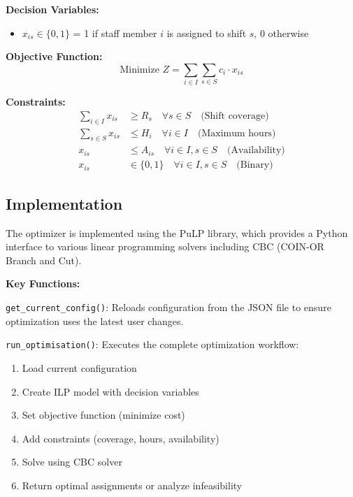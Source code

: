 \documentclass[12pt,a4paper]{article}
\begin{document}
\vspace{0.3em}
\noindent\textbf{Decision Variables:}
\begin{itemize}[topsep=4pt]
    \item $x_{is} \in \{0,1\}$ = 1 if staff member $i$ is assigned to shift $s$, 0 otherwise
\end{itemize}

\textbf{Objective Function:}
\begin{equation}
\text{Minimize } Z = \sum_{i \in I} \sum_{s \in S} c_i \cdot x_{is}
\end{equation}

\textbf{Constraints:}
\begin{align}
\sum_{i \in I} x_{is} &\geq R_s \quad \forall s \in S \quad \text{(Shift coverage)} \\
\sum_{s \in S} x_{is} &\leq H_i \quad \forall i \in I \quad \text{(Maximum hours)} \\
x_{is} &\leq A_{is} \quad \forall i \in I, s \in S \quad \text{(Availability)} \\
x_{is} &\in \{0,1\} \quad \forall i \in I, s \in S \quad \text{(Binary)}
\end{align}

\subsection{Implementation}

The optimizer is implemented using the PuLP library, which provides a Python interface to various linear programming solvers including CBC (COIN-OR Branch and Cut).

\textbf{Key Functions:}

\texttt{get\_current\_config()}: Reloads configuration from the JSON file to ensure optimization uses the latest user changes.

\texttt{run\_optimisation()}: Executes the complete optimization workflow:
\begin{enumerate}
    \item Load current configuration
    \item Create ILP model with decision variables
    \item Set objective function (minimize cost)
    \item Add constraints (coverage, hours, availability)
    \item Solve using CBC solver
    \item Return optimal assignments or analyze infeasibility
\end{enumerate}
\end{document}
